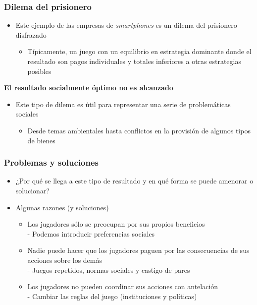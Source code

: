 \documentclass{beamer}
\begin{document}
\begin{frame}
\frametitle{Dilema del prisionero}
\begin{itemize}
    \item Este ejemplo de las empresas de \textit{smartphones} es un dilema del prisionero disfrazado
        \begin{itemize}
        \item Típicamente, un juego con un equilibrio en estrategia dominante donde el resultado son pagos individuales y totales inferiores a otras estrategias posibles
        \end{itemize}
        \end{itemize}
        \textbf{El resultado socialmente óptimo no es alcanzado} \vspace{2mm}
        \begin{itemize}
        \item Este tipo de dilema es útil para representar una serie de problemáticas sociales
        \begin{itemize}
        \item Desde temas ambientales hasta conflictos en la provisión de algunos tipos de bienes
        \end{itemize}
\end{itemize}
\end{frame}

\begin{frame}
\frametitle{Problemas y soluciones}
\begin{itemize}
    \item ¿Por qué se llega a este tipo de resultado y en qué forma se puede amenorar o solucionar?
    \item Algunas razones (y soluciones)
        \begin{itemize}
        \item Los jugadores sólo se preocupan por sus propios beneficios \\
        - Podemos introducir preferencias sociales
        \item Nadie puede hacer que los jugadores paguen por las consecuencias de sus acciones sobre los demás \\
        - Juegos repetidos, normas sociales y castigo de pares
        \item Los jugadores no pueden coordinar sus acciones con antelación \\
        - Cambiar las reglas del juego (instituciones y políticas)
        \end{itemize}
\end{itemize}
\end{frame}
\end{document}
